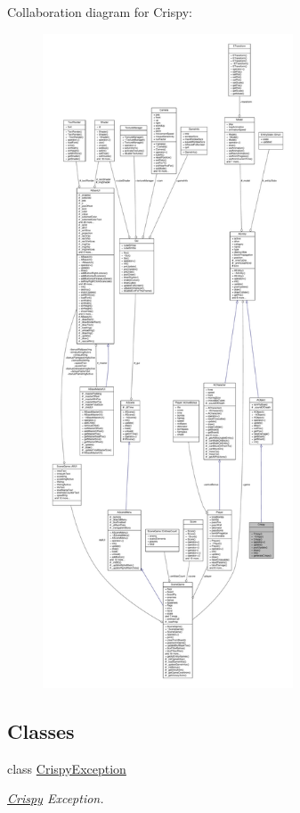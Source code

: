 Collaboration diagram for Crispy\+:
\nopagebreak
\begin{figure}[H]
\begin{center}
\leavevmode
\includegraphics[height=550pt]{class_crispy__coll__graph}
\end{center}
\end{figure}
\subsection*{Classes}
\begin{DoxyCompactItemize}
\item 
class \hyperlink{class_crispy_1_1_crispy_exception}{Crispy\+Exception}
\begin{DoxyCompactList}\small\item\em \hyperlink{class_crispy}{Crispy} Exception. \end{DoxyCompactList}\end{DoxyCompactItemize}
